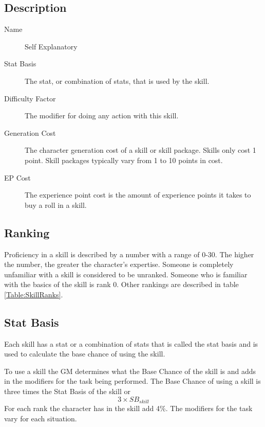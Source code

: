 \subsection{Description}

\begin{description}
	\item[Name] 
	Self Explanatory
	\item[Stat Basis] 
	The stat, or combination of stats, that is used by the skill. 
	\item[Difficulty Factor] 
	The modifier for doing any action with this skill.
	\item[Generation Cost]
	The character generation cost of a skill or skill package. Skills
	only cost 1 point. Skill packages typically vary from 1
	to 10 points in cost.
	\item[EP Cost] 
	The experience point cost is the amount of experience points it takes to
	buy a roll in a skill. 
\end{description}

\subsection{Ranking}

Proficiency in a skill is described by a number with a range of 0-30.
The higher the number, the greater the character's expertise. Someone
is completely unfamiliar with a skill is considered to be
{unranked}. Someone who is familiar with the basics of
the skill is rank 0. Other rankings are described in table
\ref{Table:SkillRanks}.



\subsection{Stat Basis}

Each skill has a stat or a combination of stats that is called the
stat basis and is used to calculate the base chance of using the 
skill. 

To use a skill the GM determines what the Base Chance of the skill is 
and adds in the modifiers for the task being performed.
The Base Chance of using a skill is three times the Stat Basis of the skill
or \[ 3 \times SB_{skill} \] For each rank the character has in the skill add 4\%.
The modifiers for the task vary for each situation.

